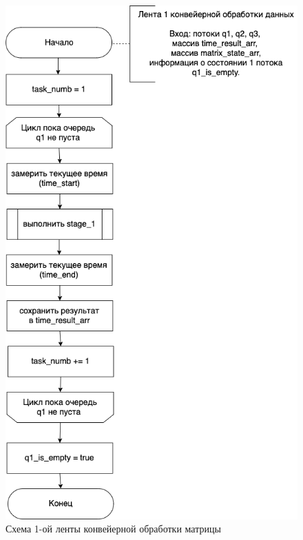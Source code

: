 \begin{figure}[h]
	\centering
	\includegraphics[scale=0.6]{img/parallel_stage_1.png}
	\caption{Схема 1-ой ленты конвейерной обработки матрицы}
	\label{fig:parallel_stage_1}
\end{figure} 

\clearpage


